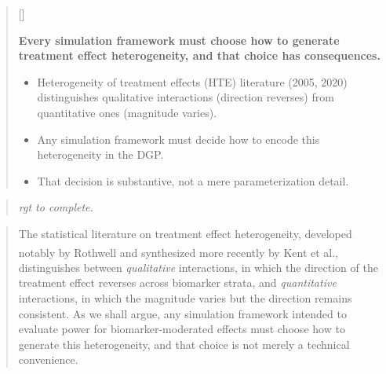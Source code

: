 \documentclass[
  11pt,
]{article}
\newcounter{pgraph}
\newenvironment{bullets}{%
  \stepcounter{pgraph}%
  \begin{quote}\small\sffamily\color[gray]{0.30}%
  {\normalfont\scriptsize\color[gray]{0.58}[\thepgraph]\enspace}}{%
  \end{quote}}
\newenvironment{rgt}{%
  \begin{quote}\small\itshape\color[RGB]{20,60,160}}{%
  \end{quote}}
\newenvironment{orig}{%
  \begin{quote}\normalsize\color[gray]{0.55}}{%
  \end{quote}}
\begin{document}
\begin{bullets}

\textbf{Every simulation framework must choose how to generate
treatment effect heterogeneity, and that choice has
consequences.}

\begin{itemize}\setlength{\itemsep}{2pt}\setlength{\parskip}{0pt}
\item Heterogeneity of treatment effects (HTE) literature (2005, 2020)
  distinguishes qualitative interactions (direction reverses)
  from quantitative ones (magnitude varies).
\item Any simulation framework must decide how to encode this
  heterogeneity in the DGP.
\item That decision is substantive, not a mere parameterization
  detail.
\end{itemize}

\end{bullets}

\begin{rgt}
rgt to complete.

\end{rgt}

\begin{orig}
The statistical literature on treatment effect heterogeneity, developed
notably by Rothwell\textsuperscript{} and
synthesized more recently by Kent et
al.\textsuperscript{}, distinguishes
between \textit{qualitative} interactions, in which the direction of the
treatment effect reverses across biomarker strata, and
\textit{quantitative} interactions, in which the magnitude varies but
the direction remains consistent. As we shall argue, any simulation
framework intended to evaluate power for biomarker-moderated effects
must choose how to generate this heterogeneity, and that choice is not
merely a technical convenience.

\end{orig}
\end{document}
